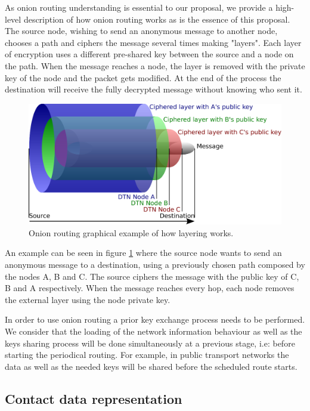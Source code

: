 As onion routing understanding is essential to our proposal, we provide a high-level description of how onion routing works as is the essence of this proposal. The source node, wishing to send an anonymous message to another node, chooses a path and ciphers the message several times making "layers". Each layer of encryption uses a different pre-shared key between the source and a node on the path. When the message reaches a node, the layer is removed with the private key of the node and the packet gets modified. At the end of the process the destination will receive the fully decrypted message without knowing who sent it.

\begin{figure}[hbt]
  \centering
  \includegraphics[scale=0.35]{imgs/onion}
  \caption{Onion routing graphical example of how layering works.}
  \label{fig:dtn-example}
\end{figure}

An example can be seen in figure \ref{fig:dtn-example} where the source node wants to send an anonymous message to a destination, using a previously chosen path composed by the nodes A, B and C. The source ciphers the message with the public key of C, B and A respectively. When the message reaches every hop, each node removes the external layer using the node private key.

In order to use onion routing a prior key exchange process needs to be performed. We consider that the loading of the network information behaviour as well as the keys sharing process will be done simultaneously at a previous stage, i.e: before starting the periodical routing. For example, in public transport networks the data as well as the needed keys will be shared before the scheduled route starts.

\subsection{Contact data representation}

